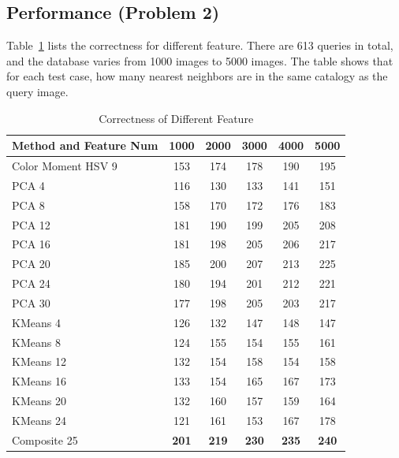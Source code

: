 \documentclass{acm_proc_article-sp}
\begin{document}
\subsection{Performance (Problem 2)}

Table~\ref{table:correctness} lists the correctness for different feature.
There are 613 queries in total, and the database varies from 1000 images
    to 5000 images.
The table shows that for each test case,
    how many nearest neighbors are in the same catalogy as
    the query image.
\begin{table} \centering 
\begin{tabular}{|p{2.1cm}|c|c|c|c|c|}
    \hline
    Method and Feature Num & 1000 & 2000 & 3000 & 4000 & 5000 \\ \hline
    Color Moment HSV 9 & 153 & 174 & 178 & 190 & 195 \\ \hline
    PCA 4 & 116 & 130 & 133 & 141 & 151 \\ \hline
    PCA 8 & 158 & 170 & 172 & 176 & 183 \\ \hline
    PCA 12 & 181 & 190 & 199 & 205 & 208 \\ \hline
    PCA 16 & 181 & 198 & 205 & 206 & 217 \\ \hline
    PCA 20 & 185 & 200 & 207 & 213 & 225 \\ \hline
    PCA 24 & 180 & 194 & 201 & 212 & 221 \\ \hline
    PCA 30 & 177 & 198 & 205 & 203 & 217 \\ \hline
    KMeans 4 & 126 & 132 & 147 & 148 & 147 \\ \hline
    KMeans 8 & 124 & 155 & 154 & 155 & 161 \\ \hline
    KMeans 12 & 132 & 154 & 158 & 154 & 158 \\ \hline
    KMeans 16 & 133 & 154 & 165 & 167 & 173 \\ \hline
    KMeans 20 & 132 & 160 & 157 & 159 & 164 \\ \hline
    KMeans 24 & 121 & 161 & 153 & 167 & 178 \\ \hline
    Composite 25 & \textbf{201} & \textbf{219} & \textbf{230} & \textbf{235} &
    \textbf{240} \\ \hline
\end{tabular} 
\caption{Correctness of Different Feature}
\label{table:correctness}
\end{table}
\end{document}
